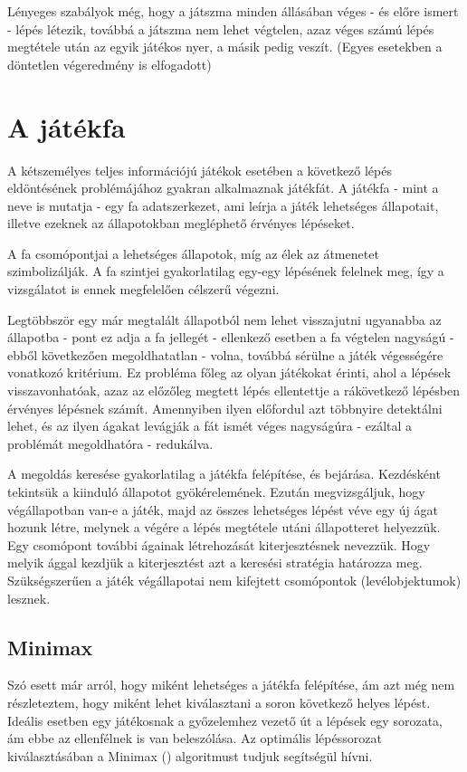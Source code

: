 Lényeges szabályok még, hogy a játszma minden állásában véges - és előre ismert - lépés létezik, továbbá a játszma nem lehet végtelen, azaz véges számú lépés megtétele után az egyik játékos nyer, a másik pedig veszít. (Egyes esetekben a döntetlen végeredmény is elfogadott)

\section{A játékfa}
A kétszemélyes teljes információjú játékok esetében a következő lépés eldöntésének problémájához gyakran alkalmaznak játékfát. A játékfa - mint a neve is mutatja - egy fa adatszerkezet, ami leírja a játék lehetséges állapotait, illetve ezeknek az állapotokban megléphető érvényes lépéseket.\ujsor

A fa csomópontjai a lehetséges állapotok, míg az élek az átmenetet szimbolizálják. A fa szintjei gyakorlatilag egy-egy lépésének felelnek meg, így a vizsgálatot is ennek megfelelően célszerű végezni.\ujsor

Legtöbbször egy már megtalált állapotból nem lehet visszajutni ugyanabba az állapotba - pont ez adja a fa jellegét - ellenkező esetben a fa végtelen nagyságú - ebből következően megoldhatatlan - volna, továbbá sérülne a játék végességére vonatkozó kritérium. Ez probléma főleg az olyan játékokat érinti, ahol a lépések visszavonhatóak, azaz az előzőleg megtett lépés ellentettje a rákövetkező lépésben érvényes lépésnek számít. Amennyiben ilyen előfordul azt többnyire detektálni lehet, és az ilyen ágakat levágják a fát ismét véges nagyságúra - ezáltal a problémát megoldhatóra - redukálva.\ujsor

A megoldás keresése gyakorlatilag a játékfa felépítése, és bejárása. Kezdésként tekintsük a kiinduló állapotot gyökérelemének. Ezután  megvizsgáljuk, hogy végállapotban van-e a játék, majd az összes lehetséges lépést véve egy új ágat hozunk létre, melynek a végére a lépés megtétele utáni állapotteret helyezzük. Egy csomópont további ágainak létrehozását kiterjesztésnek nevezzük. Hogy melyik ággal kezdjük a kiterjesztést azt a keresési stratégia határozza meg. Szükségszerűen a játék végállapotai nem kifejtett csomópontok (levélobjektumok) lesznek.\ujsor

\subsection{Minimax}
Szó esett már arról, hogy miként lehetséges a játékfa felépítése, ám azt még nem részleteztem, hogy miként lehet kiválasztani a soron következő helyes lépést. Ideális esetben egy játékosnak a győzelemhez vezető út a lépések egy sorozata, ám ebbe az ellenfélnek is van beleszólása. Az optimális lépéssorozat kiválasztásában a Minimax () algoritmust tudjuk segítségül hívni.\ujsor

